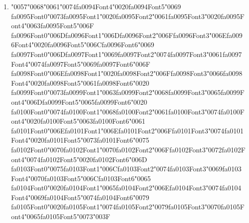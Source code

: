 \documentclass[11pt]{article}
\begin{document}
\begin{enumerate}[leftmargin=*]
  \item {\char"0057}{\char"0068}{\char"0061}{\char"0074}{\csname fa0094Font4\endcsname\char"0020}{\csname fa0094Font5\endcsname\char"0069} {\csname fa0095Font0\endcsname\char"0073}{\csname fa0095Font1\endcsname\char"0020}{\csname fa0095Font2\endcsname\char"0061}{\csname fa0095Font3\endcsname\char"0020}{\csname fa0095Font4\endcsname\char"0063}{\csname fa0095Font5\endcsname\char"006F} {\csname fa0096Font0\endcsname\char"006D}{\csname fa0096Font1\endcsname\char"006D}{\csname fa0096Font2\endcsname\char"006F}{\csname fa0096Font3\endcsname\char"006E}{\csname fa0096Font4\endcsname\char"0020}{\csname fa0096Font5\endcsname\char"006C}{\csname fa0096Font6\endcsname\char"0069} {\csname fa0097Font0\endcsname\char"006D}{\csname fa0097Font1\endcsname\char"0069}{\csname fa0097Font2\endcsname\char"0074}{\csname fa0097Font3\endcsname\char"0061}{\csname fa0097Font4\endcsname\char"0074}{\csname fa0097Font5\endcsname\char"0069}{\csname fa0097Font6\endcsname\char"006F} {\csname fa0098Font0\endcsname\char"006E}{\csname fa0098Font1\endcsname\char"0020}{\csname fa0098Font2\endcsname\char"006F}{\csname fa0098Font3\endcsname\char"0066}{\csname fa0098Font4\endcsname\char"0020}{\csname fa0098Font5\endcsname\char"0061}{\csname fa0098Font6\endcsname\char"0020} {\csname fa0099Font0\endcsname\char"0073}{\csname fa0099Font1\endcsname\char"0063}{\csname fa0099Font2\endcsname\char"0068}{\csname fa0099Font3\endcsname\char"0065}{\csname fa0099Font4\endcsname\char"006D}{\csname fa0099Font5\endcsname\char"0065}{\csname fa0099Font6\endcsname\char"0020} {\csname fa0100Font0\endcsname\char"0074}{\csname fa0100Font1\endcsname\char"0068}{\csname fa0100Font2\endcsname\char"0061}{\csname fa0100Font3\endcsname\char"0074}{\csname fa0100Font4\endcsname\char"0020}{\csname fa0100Font5\endcsname\char"0063}{\csname fa0100Font6\endcsname\char"0061} {\csname fa0101Font0\endcsname\char"006E}{\csname fa0101Font1\endcsname\char"006E}{\csname fa0101Font2\endcsname\char"006F}{\csname fa0101Font3\endcsname\char"0074}{\csname fa0101Font4\endcsname\char"0020}{\csname fa0101Font5\endcsname\char"0073}{\csname fa0101Font6\endcsname\char"0075} {\csname fa0102Font0\endcsname\char"0070}{\csname fa0102Font1\endcsname\char"0070}{\csname fa0102Font2\endcsname\char"006F}{\csname fa0102Font3\endcsname\char"0072}{\csname fa0102Font4\endcsname\char"0074}{\csname fa0102Font5\endcsname\char"0020}{\csname fa0102Font6\endcsname\char"006D} {\csname fa0103Font0\endcsname\char"0075}{\csname fa0103Font1\endcsname\char"006C}{\csname fa0103Font2\endcsname\char"0074}{\csname fa0103Font3\endcsname\char"0069}{\csname fa0103Font4\endcsname\char"0070}{\csname fa0103Font5\endcsname\char"006C}{\csname fa0103Font6\endcsname\char"0065} {\csname fa0104Font0\endcsname\char"0020}{\csname fa0104Font1\endcsname\char"0065}{\csname fa0104Font2\endcsname\char"006E}{\csname fa0104Font3\endcsname\char"0074}{\csname fa0104Font4\endcsname\char"0069}{\csname fa0104Font5\endcsname\char"0074}{\csname fa0104Font6\endcsname\char"0079} {\csname fa0105Font0\endcsname\char"0020}{\csname fa0105Font1\endcsname\char"0074}{\csname fa0105Font2\endcsname\char"0079}{\csname fa0105Font3\endcsname\char"0070}{\csname fa0105Font4\endcsname\char"0065}{\csname fa0105Font5\endcsname\char"0073}{\char"003F}

\end{enumerate}
\end{document}
